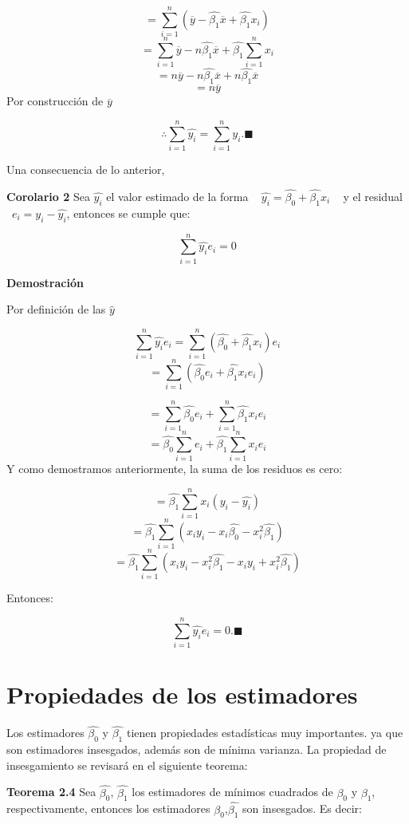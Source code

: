 \documentclass[
  a4paper,
  oneside,
  openany]{book}
\begin{document}
\[=\sum_{i=1}^{n}\left(\overline{y}-\hat{\beta_{1}}\overline{x}+\hat{\beta_{1}}x_{i}\right)\]
\[=\sum_{i=1}^{n}\overline{y}-n\hat{\beta_{1}}\overline{x}+\hat{\beta_{1}}\sum_{i=1}^{n}x_{i}\]
\[=n\overline{y}-n\hat{\beta_{1}}\overline{x}+n\hat{\beta_{1}}\overline{x}\]
\[=n\overline{y}\]
Por construcción de \(\overline{y}\)

\[\therefore \sum_{i=1}^{n}\hat{y_{i}}=\sum_{i=1}^{n}y_{i}. \blacksquare\]

Una consecuencia de lo anterior,

\textbf{Corolario 2} Sea \(\hat{y_{i}}\) el valor estimado de la forma ~ \(\hat{y_{i}}=\hat{\beta_{0}}+\hat{\beta_{1}}x_{i}\) ~ y el residual ~\(e_{i}=y_{i}-\hat{y_{i}}\), entonces se cumple que:

\[\sum_{i=1}^{n}\hat{y_{i}}e_{i}=0\]

\textbf{Demostración}

Por definición de las \(\hat{y}\)

\[\sum_{i=1}^{n}\hat{y_{i}}e_{i}=\sum_{i=1}^{n}(\hat{\beta_{0}}+\hat{\beta_{1}}x_{i})e_{i}\]
\[=\sum_{i=1}^{n}\left(\hat{\beta_{0}}e_{i}+\hat{\beta_{1}}x_{i}e_{i}\right)\]

\[=\sum_{i=1}^{n}\hat{\beta_{0}}e_{i}+\sum_{i=1}^{n}\hat{\beta_{1}}x_{i}e_{i}\]
\[=\hat{\beta_{0}}\sum_{i=1}^{n}e_{i}+\hat{\beta_{1}}\sum_{i=1}^{n}x_{i}e_{i}\]
Y como demostramos anteriormente, la suma de los residuos es cero:

\[=\hat{\beta_{1}}\sum_{i=1}^{n}x_{i}(y_{i}-\hat{y_{i}})\]
\[=\hat{\beta_{1}}\sum_{i=1}^{n}\left(x_{i}y_{i}-x_{i}\hat{\beta_{0}}-x_{i}^{2}\hat{\beta_{1}}\right)\]
\[=\hat{\beta_{1}}\sum_{i=1}^{n}\left(x_{i}y_{i}-x_{i}^2\hat{\beta_{1}}-x_{i}y_{i}+x_{i}^{2}\hat{\beta_{1}}\right)\]

Entonces:

\[\sum_{i=1}^{n}\hat{y_{i}}e_{i}=0. \blacksquare\]

\hypertarget{propiedades-de-los-estimadores}{%
\section{Propiedades de los estimadores}\label{propiedades-de-los-estimadores}}

Los estimadores \(\hat{\beta_{0}}\) y \(\hat{\beta_{1}}\) tienen propiedades estadísticas muy importantes. ya que son estimadores insesgados, además son de mínima varianza. La propiedad de insesgamiento se revisará en el siguiente teorema:

\textbf{Teorema 2.4} Sea \(\hat{\beta_{0}}\), \(\hat{\beta_{1}}\) los estimadores de mínimos cuadrados de \(\beta_{0}\) y \(\beta_{1}\), respectivamente, entonces los estimadores \(\hat{\beta_{0}}\),\(\hat{\beta_{1}}\) son insesgados. Es decir:
\end{document}
